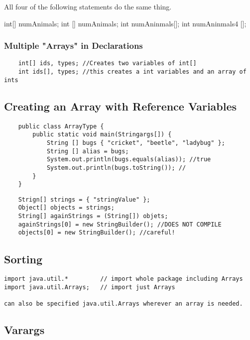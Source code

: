 \documentclass[a4paper]{report}   %
\begin{document}
All four of the following statements do the same thing.

\begin{lstlistings}
	int[] numAnimals;
	int [] numAnimals;
	int numAninmals[];
	int numAninmals4 [];
\end{lstlistings}

\subsubsection{Multiple "Arrays" in Declarations}

\begin{lstlisting}
	int[] ids, types; //Creates two variables of int[]
	int ids[], types; //this creates a int variables and an array of ints
\end{lstlisting}

\subsection{Creating an Array with Reference Variables}

\begin{lstlisting}
	public class ArrayType {
		public static void main(Stringargs[]) {
			String [] bugs { "cricket", "beetle", "ladybug" };
			String [] alias = bugs;
			System.out.println(bugs.equals(alias)); //true
			System.out.println(bugs.toString()); //
		}
	}
\end{lstlisting}


\begin{lstlisting}
	Strign[] strings = { "stringValue" };
	Object[] objects = strings;
	String[] againStrings = (String[]) objets;
	againStrings[0] = new StringBuilder(); //DOES NOT COMPILE
	objects[0] = new StringBuilder(); //careful!
\end{lstlisting}

\subsection*{Sorting}

\begin{lstlisting}
import java.util.*         // import whole package including Arrays
import java.util.Arrays;   // import just Arrays

can also be specified java.util.Arrays wherever an array is needed.

\end{lstlisting}

\subsection{Varargs}
\end{document}

